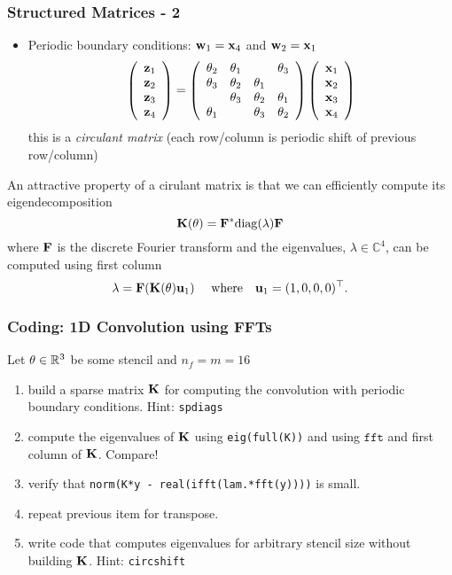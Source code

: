 \documentclass[12pt,fleqn,handout]{beamer}
\begin{document}
\begin{frame}
	\frametitle{Structured Matrices - 2}
	\begin{itemize}
		\item Periodic boundary conditions: ${\bf w}_1 = {\bf x}_4$ and ${\bf w}_2 = {\bf x}_1$
	$$
		\left( 
		\begin{array}{r}
			{\bf z}_1\\
			{\bf z}_2\\
			{\bf z}_3\\
			{\bf z}_4
		\end{array}
		\right)
		=
		\left( 
		\begin{array}{rrrr}
			        \theta_2 & \theta_1 &          & \theta_3  \\
			        \theta_3 & \theta_2 & \theta_1 &           \\
			                 & \theta_3 & \theta_2 & \theta_1  \\
			        \theta_1 &          & \theta_3 & \theta_2  \\
		\end{array}
		\right)
		\left( 
		\begin{array}{r}
			{\bf x}_1\\
			{\bf x}_2\\
			{\bf x}_3\\
			{\bf x}_4\\
		\end{array}
		\right)
	$$
	this is a \emph{circulant matrix} (each row/column is periodic shift of previous row/column)
	\end{itemize}
	\pause
	
	An attractive property of a cirulant matrix is that we can efficiently compute its eigendecomposition
	$$
		{\bf K}(\theta) = {\bf F}^* {\rm diag}(\lambda) {\bf F}
	$$ 
	where ${\bf F}$ is the discrete Fourier transform and the eigenvalues, $\lambda \in {\mathbb{C}}^4$, can be computed using first column
	$$
		\lambda =   {\bf F}( {\bf K}(\theta) {\bf u}_1) \quad \text{ where} \quad {\bf u}_1 = (1,0,0,0)^\top.
	$$ 	
\end{frame}

\begin{frame}\frametitle{Coding: 1D Convolution using FFTs}
	Let $\theta \in \mathbb{R}^3$ be some stencil and $n_f = m = 16$ 
\begin{enumerate}
	\item build a sparse matrix ${\bf K}$ for computing the convolution with periodic boundary conditions. 
	Hint: \texttt{spdiags}
	
	\item compute the eigenvalues of ${\bf K}$ using \texttt{eig(full(K))} and using $\texttt{fft}$ and first column of ${\bf K}$. Compare!
	
	\item verify that \texttt{norm(K*y - real(ifft(lam.*fft(y))))} is small.
	
	\item repeat previous item for transpose.
	
	\item write code that computes eigenvalues for arbitrary stencil size without building ${\bf K}$. Hint: \texttt{circshift}
\end{enumerate}
\end{frame}
\end{document}
